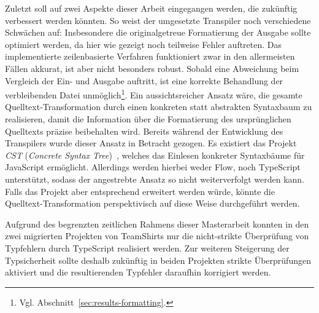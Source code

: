 Zuletzt soll auf zwei Aspekte dieser Arbeit eingegangen werden, die zukünftig verbessert werden könnten. So weist der umgesetzte Transpiler noch verschiedene Schwächen auf: Insbesondere die originalgetreue Formatierung der Ausgabe sollte optimiert werden, da hier wie gezeigt noch teilweise Fehler auftreten. Das implementierte zeilenbasierte Verfahren funktioniert zwar in den allermeisten Fällen akkurat, ist aber nicht besonders robust. Sobald eine Abweichung beim Vergleich der Ein- und Ausgabe auftritt, ist eine korrekte Behandlung der verbleibenden Datei unmöglich\footnote{Vgl. Abschnitt~\ref{sec:results-formatting}.}. Ein aussichtsreicher Ansatz wäre, die gesamte Quelltext-Transformation durch einen konkreten statt abstrakten Syntaxbaum zu realisieren, damit die Information über die Formatierung des ursprünglichen Quelltexts präzise beibehalten wird. Bereits während der Entwicklung des Transpilers wurde dieser Ansatz in Betracht gezogen. Es existiert das Projekt \textit{CST} (\textit{Concrete Syntax Tree})~\autocite{SOFTWARE:CST}, welches das Einlesen konkreter Syntaxbäume für JavaScript ermöglicht. Allerdings werden hierbei weder Flow, noch TypeScript unterstützt, sodass der angestrebte Ansatz so nicht weiterverfolgt werden kann. Falls das Projekt aber entsprechend erweitert werden würde, könnte die Quelltext-Transformation perspektivisch auf diese Weise durchgeführt werden.

Aufgrund des begrenzten zeitlichen Rahmens dieser Masterarbeit konnten in den zwei migrierten Projekten von TeamShirts nur die nicht-strikte Überprüfung von Typfehlern durch TypeScript realisiert werden. Zur weiteren Steigerung der Typsicherheit sollte deshalb zukünftig in beiden Projekten strikte Überprüfungen aktiviert und die resultierenden Typfehler daraufhin korrigiert werden.
